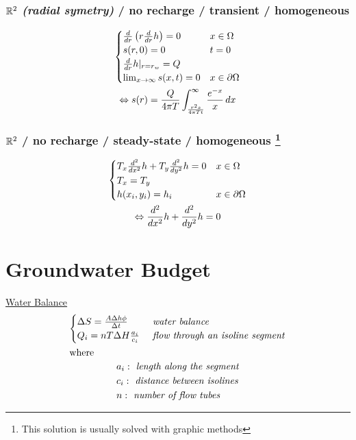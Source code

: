\documentclass[landscape]{article}
\begin{document}
\begin{multicols*}{3}

\subsubsection{$\R^2$ \emph{(radial symetry)} / no recharge / transient / homogeneous} %
\label{ssub:6}

\begin{multline*}
  \begin{cases}
     \frac{d }{d r}\left(r\frac{d }{d r}h\right) = 0 & x \in \Omega \\
     s(r,0) = 0 & t=0 \\
     \frac{d }{d r}h |_{r=r_w} =Q &\\
    \lim_{x\to \infty} s(x,t) = 0 & x \in \partial\Omega \\
  \end{cases}\\
  \Leftrightarrow s(r) = \frac{Q}{4\pi T}\int_{\frac{r^2s}{4\pi Tt}}^\infty \frac{e^{-x}}{x}\,dx
\end{multline*}


\subsubsection[$\R^2$ / no recharge / steady-state / homogeneous]{$\R^2$ / no recharge / steady-state / homogeneous \footnote{This solution is usually solved with graphic methods}} %
\label{ssub:7}
\begin{multline*}
  \begin{cases}
    T_x \frac{d^2 }{d x^2}h + T_y \frac{d^2 }{d y^2}h = 0 & x \in \Omega \\
    T_x = T_y & \\
    h(x_i,y_i) = h_i & x \in \partial\Omega
  \end{cases}\\
  \Leftrightarrow  \frac{d^2 }{d x^2}h +  \frac{d^2 }{d y^2}h = 0
\end{multline*}

\section{Groundwater Budget} %
\label{sec:groundwater_budget}
\underline{Water Balance}
  \begin{gather}\label{eq:2.1}
    \begin{cases}
      \Delta S = \frac{A \Delta h \phi}{\Delta t} & \emph{ water balance}\\
      Q_i = nT \Delta H \frac{a_i}{c_i} & \emph{ flow through an isoline segment}
    \end{cases}
        \notag\\
      \shortintertext{where}
      \begin{aligned}
        & a_i: \emph{ length along the segment}\\
        & c_i: \emph{ distance between isolines}\\
        & n: \emph{ number of flow tubes}
      \end{aligned}\notag
  \end{gather}


\end{multicols*}
\end{document}
